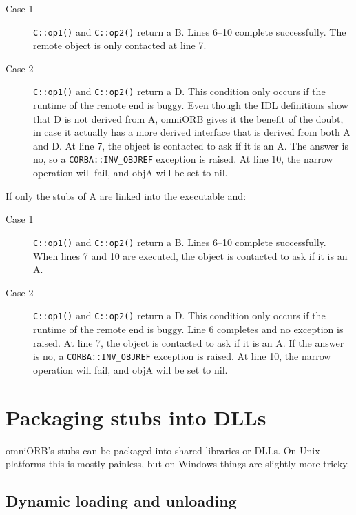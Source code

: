 \documentclass[11pt,twoside,a4paper]{book}
\newcommand{\code}[1]{\texttt{#1}}
\newcommand{\op}[1]{\texttt{#1()}}
\begin{document}
\begin{description}
\item[Case 1] \op{C::op1} and \op{C::op2} return a B. Lines 6--10
complete successfully. The remote object is only contacted at line 7.

\item[Case 2] \op{C::op1} and \op{C::op2} return a D. This condition
only occurs if the runtime of the remote end is buggy. Even though the
IDL definitions show that D is not derived from A, omniORB gives it
the benefit of the doubt, in case it actually has a more derived
interface that is derived from both A and D. At line 7, the object is
contacted to ask if it is an A. The answer is no, so a
\code{CORBA::INV\_OBJREF} exception is raised. At line 10, the narrow
operation will fail, and objA will be set to nil.
\end{description}

\noindent If only the stubs of A are linked into the executable and:

\begin{description}
\item[Case 1] \op{C::op1} and \op{C::op2} return a B. Lines 6--10
complete successfully. When lines 7 and 10 are executed, the object is
contacted to ask if it is an A.

\item[Case 2] \op{C::op1} and \op{C::op2} return a D. This condition
only occurs if the runtime of the remote end is buggy. Line 6
completes and no exception is raised. At line 7, the object is
contacted to ask if it is an A. If the answer is no, a
\code{CORBA::INV\_OBJREF} exception is raised. At line 10, the narrow
operation will fail, and objA will be set to nil.
\end{description}





\chapter{Packaging stubs into DLLs}
\label{chap:dlls}


omniORB's stubs can be packaged into shared libraries or DLLs. On Unix
platforms this is mostly painless, but on Windows things are slightly
more tricky.


\section{Dynamic loading and unloading}
\end{document}
